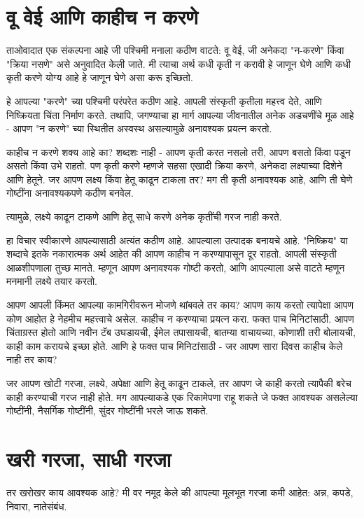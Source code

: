 \chapter{ वू वेई आणि काहीच न करणे}

ताओवादात एक संकल्पना आहे जी पश्चिमी मनाला कठीण वाटते: वू वेई, जी अनेकदा "न-करणे" किंवा "क्रिया नसणे" असे अनुवादित केली जाते. मी त्याचा अर्थ कधी कृती न करावी हे जाणून घेणे आणि कधी कृती करणे योग्य आहे हे जाणून घेणे असा करू इच्छितो.

हे आपल्या "करणे" च्या पश्चिमी परंपरेत कठीण आहे. आपली संस्कृती कृतीला महत्त्व देते, आणि निष्क्रियता चिंता निर्माण करते. तथापि, जगण्याचा हा मार्ग आपल्या जीवनातील अनेक अडचणींचे मूळ आहे - आपण "न करणे" च्या स्थितीत अस्वस्थ असल्यामुळे अनावश्यक प्रयत्न करतो.

काहीच न करणे शक्य आहे का? शब्दशः नाही - आपण कृती करत नसलो तरी, आपण बसतो किंवा पडून असतो किंवा उभे राहतो. पण कृती करणे म्हणजे सहसा एखादी क्रिया करणे, अनेकदा लक्ष्याच्या दिशेने आणि हेतूने. जर आपण लक्ष्य किंवा हेतू काढून टाकला तर? मग ती कृती अनावश्यक आहे, आणि ती घेणे गोष्टींना अनावश्यकपणे कठीण बनवेल.

त्यामुळे, लक्ष्ये काढून टाकणे आणि हेतू साधे करणे अनेक कृतींची गरज नाही करते.

हा विचार स्वीकारणे आपल्यासाठी अत्यंत कठीण आहे. आपल्याला उत्पादक बनायचे आहे. "निष्क्रिय" या शब्दाचे इतके नकारात्मक अर्थ आहेत की आपण काहीच न करण्यापासून दूर राहतो. आपली संस्कृती आळशीपणाला तुच्छ मानते. म्हणून आपण अनावश्यक गोष्टी करतो, आणि आपल्याला असे वाटते म्हणून मनमानी लक्ष्ये तयार करतो.

आपण आपली किंमत आपल्या कामगिरीवरून मोजणे थांबवले तर काय? आपण काय करतो त्यापेक्षा आपण कोण आहोत हे नेहमीच महत्त्वाचे असेल. काहीच न करण्याचा प्रयत्न करा. फक्त पाच मिनिटांसाठी. आपण चिंताग्रस्त होतो आणि नवीन टॅब उघडायची, ईमेल तपासायची, बातम्या वाचायच्या, कोणाशी तरी बोलायची, काही काम करायचे इच्छा होते. आणि हे फक्त पाच मिनिटांसाठी - जर आपण सारा दिवस काहीच केले नाही तर काय?

जर आपण खोटी गरजा, लक्ष्ये, अपेक्षा आणि हेतू काढून टाकले, तर आपण जे काही करतो त्यापैकी बरेच काही करण्याची गरज नाही होते. मग आपल्याकडे एक रिकामेपणा राहू शकते जे फक्त आवश्यक असलेल्या गोष्टींनी, नैसर्गिक गोष्टींनी, सुंदर गोष्टींनी भरले जाऊ शकते.

\chapter{खरी गरजा, साधी गरजा}

तर खरोखर काय आवश्यक आहे? मी वर नमूद केले की आपल्या मूलभूत गरजा कमी आहेत: अन्न, कपडे, निवारा, नातेसंबंध.

